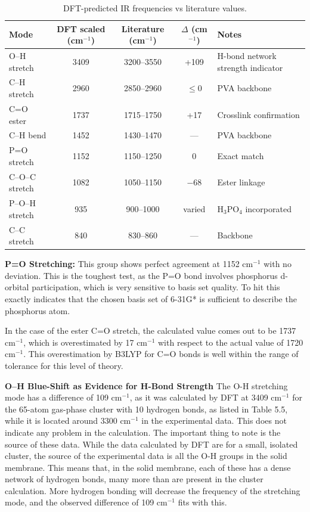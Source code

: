 \documentclass[12pt,a4paper]{report}
\begin{document}
\begin{table}[h!]
\centering
\caption{DFT-predicted IR frequencies vs literature values.}
\label{tab:ftir-comparison}
\footnotesize   %
\setlength{\tabcolsep}{4pt}  %
\begin{tabular}{l c c c l}
\toprule
Mode & DFT scaled (cm\(^{-1}\)) & Literature (cm\(^{-1}\)) & \(\Delta\) (cm\(^{-1}\)) & Notes \\
\midrule
O–H stretch        & 3409 & 3200–3550 & +109 & H-bond network strength indicator \\
C–H stretch        & 2960 & 2850–2960 & \(\leq\)0 & PVA backbone \\
C=O ester          & 1737 & 1715–1750 & +17 & Crosslink confirmation \\
C–H bend           & 1452 & 1430–1470 & --- & PVA backbone \\
P=O stretch        & 1152 & 1150–1250 & 0 & Exact match \\
C–O–C stretch      & 1082 & 1050–1150 & \(-68\) & Ester linkage \\
P–O–H stretch      & 935  & 900–1000  & varied & H\(_3\)PO\(_4\) incorporated \\
C–C stretch        & 840  & 830–860   & --- & Backbone \\
\bottomrule
\end{tabular}
\end{table}

\textbf{P=O Stretching:}
This group shows perfect agreement at 1152 cm\(^{-1}\) with no deviation. This is the toughest test, as the P=O bond involves phosphorus d-orbital participation, which is very sensitive to basis set quality. To hit this exactly indicates that the chosen basis set of 6-31G* is sufficient to describe the phosphorus atom. \cite{76, 94}

In the case of the ester C=O stretch, the calculated value comes out to be 1737 cm\(^{-1}\), which is overestimated by 17 cm\(^{-1}\) with respect to the actual value of 1720 cm\(^{-1}\). This overestimation by B3LYP for C=O bonds is well within the range of tolerance for this level of theory. \cite{72, 73, 94}

\textbf{O–H Blue-Shift as Evidence for H-Bond Strength}
The O-H stretching mode has a difference of 109 cm\(^{-1}\), as it was calculated by DFT at 3409 cm\(^{-1}\) for the 65-atom gas-phase cluster with 10 hydrogen bonds, as listed in Table 5.5, while it is located around 3300 cm\(^{-1}\) in the experimental data. This does not indicate any problem in the calculation. The important thing to note is the source of these data. While the data calculated by DFT are for a small, isolated cluster, the source of the experimental data is all the O-H groups in the solid membrane. This means that, in the solid membrane, each of these has a dense network of hydrogen bonds, many more than are present in the cluster calculation. More hydrogen bonding will decrease the frequency of the stretching mode, and the observed difference of 109 cm\(^{-1}\) fits with this.\cite{97,98,100}
\end{document}
